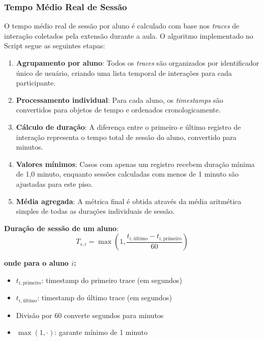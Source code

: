 \subsubsection{Tempo Médio Real de Sessão}
O tempo médio real de sessão por aluno é calculado com base nos \textit{traces} de interação coletados pela extensão durante a aula. O algoritmo implementado no Script segue as seguintes etapas:

\begin{enumerate}
    \item \textbf{Agrupamento por aluno}: Todos os \textit{traces} são organizados por identificador único de usuário, criando uma lista temporal de interações para cada participante.
    
    \item \textbf{Processamento individual}: Para cada aluno, os \textit{timestamps} são convertidos para objetos de tempo e ordenados cronologicamente.
    
    \item \textbf{Cálculo de duração}: A diferença entre o primeiro e último registro de interação representa o tempo total de sessão do aluno, convertido para minutos.
    
    \item \textbf{Valores mínimos}: Casos com apenas um registro recebem duração mínima de 1,0 minuto, enquanto sessões calculadas com menos de 1 minuto são ajustadas para este piso.
    
    \item \textbf{Média agregada}: A métrica final é obtida através da média aritmética simples de todas as durações individuais de sessão.
\end{enumerate}


\textbf{Duração de sessão de um aluno}:
\begin{equation}
T_{s,i} = \max\left(1, \frac{t_{i,\text{último}} - t_{i,\text{primeiro}}}{60}\right)
\end{equation}

\textbf{onde para o aluno $i$:}
\begin{itemize}
    \item $t_{i,\text{primeiro}}$: timestamp do primeiro trace (em segundos)
    \item $t_{i,\text{último}}$: timestamp do último trace (em segundos)
    \item Divisão por 60 converte segundos para minutos
    \item $\max(1, \cdot)$: garante mínimo de 1 minuto
\end{itemize}


